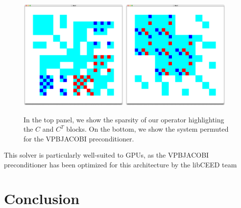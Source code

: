 \documentclass[twoside,leqno,twocolumn]{article}
\begin{document}
\begin{figure}
\centering
\includegraphics[width=0.48\textwidth]{figures/TwoFaultSystem.png}
\includegraphics[width=0.48\textwidth]{figures/TwoFaultSystemPerm.png}
\caption{In the top panel, we show the sparsity of our operator highlighting the $C$ and $C^T$ blocks. On the bottom, we show the system permuted for the VPBJACOBI preconditioner.\label{fig:sparsityC}}
\end{figure}

This solver is particularly well-suited to GPUs, as the VPBJACOBI preconditioner has been optimized for this architecture by the libCEED team~\cite{brownbarrabeamsghaffariknepleymosesshakeristengelthompsonzhang2022}

\section{Conclusion}



\end{document}

